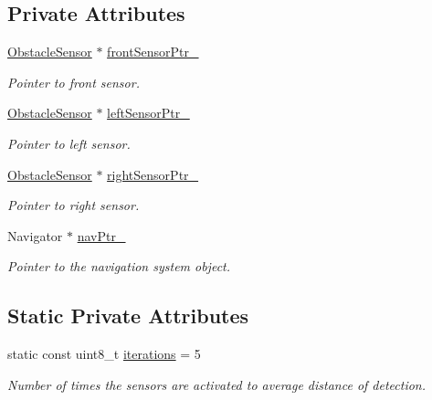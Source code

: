 \subsection*{Private Attributes}
\begin{DoxyCompactItemize}
\item 
\mbox{\hyperlink{class_obstacle_sensor}{Obstacle\+Sensor}} $\ast$ \mbox{\hyperlink{class_obstacle_detection_ab6e8507df02f3b6d9282d0253ac338f3}{front\+Sensor\+Ptr\+\_\+}}
\begin{DoxyCompactList}\small\item\em Pointer to front sensor. \end{DoxyCompactList}\item 
\mbox{\hyperlink{class_obstacle_sensor}{Obstacle\+Sensor}} $\ast$ \mbox{\hyperlink{class_obstacle_detection_a97a24fb4fe1b9d54c2a2bd377426f339}{left\+Sensor\+Ptr\+\_\+}}
\begin{DoxyCompactList}\small\item\em Pointer to left sensor. \end{DoxyCompactList}\item 
\mbox{\hyperlink{class_obstacle_sensor}{Obstacle\+Sensor}} $\ast$ \mbox{\hyperlink{class_obstacle_detection_a25b7aed86ead63e6f71154855cc2d42c}{right\+Sensor\+Ptr\+\_\+}}
\begin{DoxyCompactList}\small\item\em Pointer to right sensor. \end{DoxyCompactList}\item 
Navigator $\ast$ \mbox{\hyperlink{class_obstacle_detection_aa68ee81b360a24f6977480aab44f5650}{nav\+Ptr\+\_\+}}
\begin{DoxyCompactList}\small\item\em Pointer to the navigation system object. \end{DoxyCompactList}\end{DoxyCompactItemize}
\subsection*{Static Private Attributes}
\begin{DoxyCompactItemize}
\item 
static const uint8\+\_\+t \mbox{\hyperlink{class_obstacle_detection_a37811b168a642890429f6752118341cc}{iterations}} = 5
\begin{DoxyCompactList}\small\item\em Number of times the sensors are activated to average distance of detection. \end{DoxyCompactList}\end{DoxyCompactItemize}


